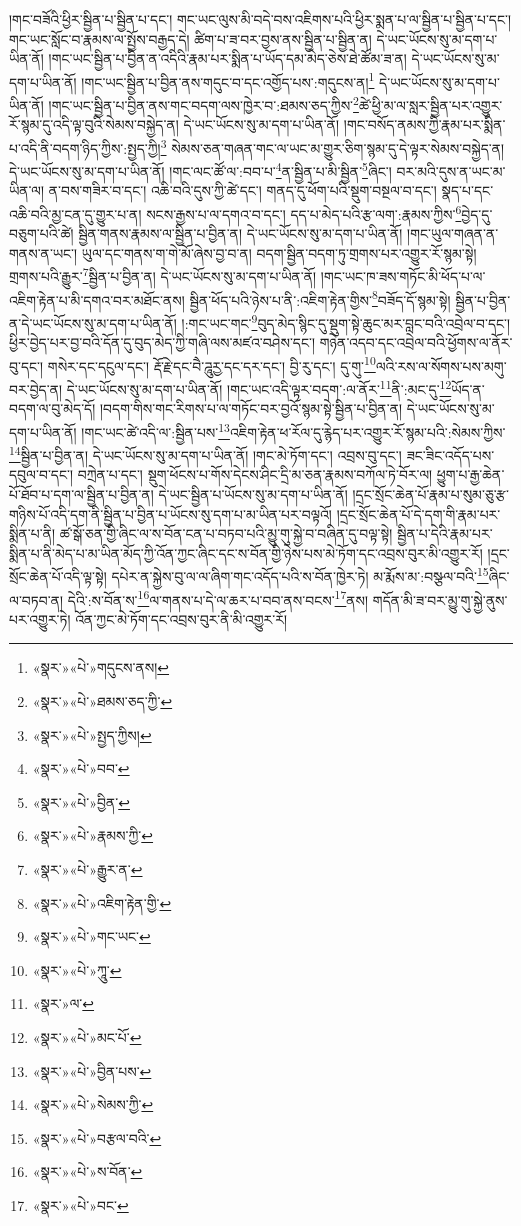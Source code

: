 །གང་བཟོའི་ཕྱིར་སྦྱིན་པ་སྦྱིན་པ་དང་། གང་ཡང་ལུས་མི་བདེ་བས་འཇིགས་པའི་ཕྱིར་སྨན་པ་ལ་སྦྱིན་པ་སྦྱིན་པ་དང་། གང་ཡང་སློང་བ་རྣམས་ལ་སྤྱོས་བརྒྱད་དེ། ཚིག་པ་ཟ་བར་བྱས་ནས་སྦྱིན་པ་སྦྱིན་ན། དེ་ཡང་ཡོངས་སུ་མ་དག་པ་ཡིན་ནོ། །གང་ཡང་སྦྱིན་པ་བྱིན་ན་འདིའི་རྣམ་པར་སྨིན་པ་ཡོད་དམ་མེད་ཅེས་ཐེ་ཚོམ་ཟ་ན། དེ་ཡང་ཡོངས་སུ་མ་དག་པ་ཡིན་ནོ། །གང་ཡང་སྦྱིན་པ་བྱིན་ནས་གདུང་བ་དང་འགྱོད་པས་:གདུངས་ན།\footnote{«སྣར་»«པེ་»གདུངས་ནས།} དེ་ཡང་ཡོངས་སུ་མ་དག་པ་ཡིན་ནོ། །གང་ཡང་སྦྱིན་པ་བྱིན་ནས་གང་བདག་ལས་ཁྱེར་བ་:ཐམས་ཅད་ཀྱིས་\footnote{«སྣར་»«པེ་»ཐམས་ཅད་ཀྱི་}ཚེ་ཕྱི་མ་ལ་སླར་སྦྱིན་པར་འགྱུར་རོ་སྙམ་དུ་འདི་ལྟ་བུའི་སེམས་བསྐྱེད་ན། དེ་ཡང་ཡོངས་སུ་མ་དག་པ་ཡིན་ནོ། །གང་བསོད་ནམས་ཀྱི་རྣམ་པར་སྨིན་པ་འདི་ནི་བདག་ཉིད་ཀྱིས་:སྤྱད་ཀྱི།\footnote{«སྣར་»«པེ་»སྤྱད་ཀྱིས།} སེམས་ཅན་གཞན་གང་ལ་ཡང་མ་གྱུར་ཅིག་སྙམ་དུ་དེ་ལྟར་སེམས་བསྐྱེད་ན། དེ་ཡང་ཡོངས་སུ་མ་དག་པ་ཡིན་ནོ། །གང་ལང་ཚོ་ལ་:བབ་པ་\footnote{«སྣར་»«པེ་»བབ་}ན་སྦྱིན་པ་མི་སྦྱིན་\footnote{«སྣར་»«པེ་»བྱིན་}ཞིང་། བར་མའི་དུས་ན་ཡང་མ་ཡིན་ལ། ན་བས་གཟིར་བ་དང་། འཆི་བའི་དུས་ཀྱི་ཚེ་དང་། གནད་དུ་ཕོག་པའི་སྡུག་བསྔལ་བ་དང་། སྣད་པ་དང་འཆི་བའི་མྱ་ངན་དུ་གྱུར་པ་ན། སངས་རྒྱས་པ་ལ་དགའ་བ་དང་། དད་པ་མེད་པའི་རྩ་ལག་:རྣམས་ཀྱིས་\footnote{«སྣར་»«པེ་»རྣམས་ཀྱི་}བྱེད་དུ་བཅུག་པའི་ཚེ། སྦྱིན་གནས་རྣམས་ལ་སྦྱིན་པ་བྱིན་ན། དེ་ཡང་ཡོངས་སུ་མ་དག་པ་ཡིན་ནོ། །གང་ཡུལ་གཞན་ན་གནས་ན་ཡང་། ཡུལ་དང་གནས་ག་གེ་མོ་ཞེས་བྱ་བ་ན། བདག་སྦྱིན་བདག་ཏུ་གྲགས་པར་འགྱུར་རོ་སྙམ་སྟེ། གྲགས་པའི་རྒྱུར་\footnote{«སྣར་»«པེ་»རྒྱུར་ན་}སྦྱིན་པ་བྱིན་ན། དེ་ཡང་ཡོངས་སུ་མ་དག་པ་ཡིན་ནོ། །གང་ཡང་ཁ་ཟས་གཏོང་མི་ཕོད་པ་ལ་འཇིག་རྟེན་པ་མི་དགའ་བར་མཐོང་ནས། སྦྱིན་ཕོད་པའི་ཉེས་པ་ནི་:འཇིག་རྟེན་གྱིས་\footnote{«སྣར་»«པེ་»འཇིག་རྟེན་གྱི་}བཟོད་དོ་སྙམ་སྟེ། སྦྱིན་པ་བྱིན་ན་དེ་ཡང་ཡོངས་སུ་མ་དག་པ་ཡིན་ནོ། །:གང་ཡང་གང་\footnote{«སྣར་»«པེ་»གང་ཡང་}བུད་མེད་སྙིང་དུ་སྡུག་སྟེ་ཆུང་མར་བླང་བའི་འབྲེལ་བ་དང་། ཕྱིར་བྱེད་པར་བྱ་བའི་དོན་དུ་བུད་མེད་ཀྱི་གཞི་ལས་མཛའ་བཤེས་དང་། གཉེན་འདབ་དང་འབྲེལ་བའི་ཕྱོགས་ལ་ནོར་བུ་དང་། གསེར་དང་དངུལ་དང་། རྡོ་རྗེ་དང་བཻ་ཌཱུརྱ་དང་དར་དང་། བྱི་རུ་དང་། དུ་གུ་\footnote{«སྣར་»«པེ་»ཀཱུ་}ལའི་རས་ལ་སོགས་པས་མགུ་བར་བྱེད་ན། དེ་ཡང་ཡོངས་སུ་མ་དག་པ་ཡིན་ནོ། །གང་ཡང་འདི་ལྟར་བདག་:ལ་ནོར་\footnote{«སྣར་»ལ་}ནི་:མང་དུ་\footnote{«སྣར་»«པེ་»མང་པོ་}ཡོད་ན་བདག་ལ་བུ་མེད་དོ། །བདག་གིས་གང་རིགས་པ་ལ་གཏོང་བར་བྱའོ་སྙམ་སྟེ་སྦྱིན་པ་བྱིན་ན། དེ་ཡང་ཡོངས་སུ་མ་དག་པ་ཡིན་ནོ། །གང་ཡང་ཚེ་འདི་ལ་:སྦྱིན་པས་\footnote{«སྣར་»«པེ་»བྱིན་པས་}འཇིག་རྟེན་ཕ་རོལ་དུ་རྙེད་པར་འགྱུར་རོ་སྙམ་པའི་:སེམས་ཀྱིས་\footnote{«སྣར་»«པེ་»སེམས་ཀྱི་}སྦྱིན་པ་བྱིན་ན། དེ་ཡང་ཡོངས་སུ་མ་དག་པ་ཡིན་ནོ། །གང་མེ་ཏོག་དང་། འབྲས་བུ་དང་། ཟང་ཟིང་འདོད་པས་དབུལ་བ་དང་། བཀྲེན་པ་དང་། སྡུག་ཕོངས་པ་གོས་དེངས་ཤིང་དྲི་མ་ཅན་རྣམས་བཀོལ་ཏེ་བོར་ལ། ཕྱུག་པ་རྒྱ་ཆེན་པོ་ཐོབ་པ་དག་ལ་སྦྱིན་པ་བྱིན་ན། དེ་ཡང་སྦྱིན་པ་ཡོངས་སུ་མ་དག་པ་ཡིན་ནོ། །དྲང་སྲོང་ཆེན་པོ་རྣམ་པ་སུམ་ཅུ་རྩ་གཉིས་པོ་འདི་དག་ནི་སྦྱིན་པ་བྱིན་པ་ཡོངས་སུ་དག་པ་མ་ཡིན་པར་བལྟའོ། །དྲང་སྲོང་ཆེན་པོ་དེ་དག་གི་རྣམ་པར་སྨིན་པ་ནི། ཚ་སྒོ་ཅན་གྱི་ཞིང་ལ་ས་བོན་ངན་པ་བཏབ་པའི་མྱུ་གུ་སྐྱེ་བ་བཞིན་དུ་བལྟ་སྟེ། སྦྱིན་པ་དེའི་རྣམ་པར་སྨིན་པ་ནི་མེད་པ་མ་ཡིན་མོད་ཀྱི་འོན་ཀྱང་ཞིང་དང་ས་བོན་གྱི་ཉེས་པས་མེ་ཏོག་དང་འབྲས་བུར་མི་འགྱུར་རོ། །དྲང་སྲོང་ཆེན་པོ་འདི་ལྟ་སྟེ། དཔེར་ན་སྐྱེས་བུ་ལ་ལ་ཞིག་གང་འདོད་པའི་ས་བོན་ཁྱེར་ཏེ། མ་རྨོས་མ་:བསྩལ་བའི་\footnote{«སྣར་»«པེ་»བརྩལ་བའི་}ཞིང་ལ་བཏབ་ན། དེའི་:ས་བོན་ས་\footnote{«སྣར་»«པེ་»ས་བོན་}ལ་གནས་པ་དེ་ལ་ཆར་པ་བབ་ནས་བངས་\footnote{«སྣར་»«པེ་»བང་}ནས། གདོན་མི་ཟ་བར་མྱུ་གུ་སྐྱེ་ནུས་པར་འགྱུར་ཏེ། འོན་ཀྱང་མེ་ཏོག་དང་འབྲས་བུར་ནི་མི་འགྱུར་རོ། 